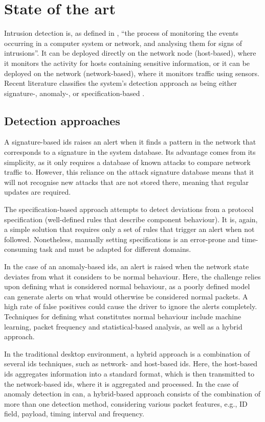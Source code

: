 \chapter{State of the art}
\label{c:sota}

Intrusion detection is, as defined in \cite{Liao2013}, “the process of monitoring the events occurring in a computer system or network, and analysing them for signs of intrusions”. It can be deployed directly on the network node (host-based), where it monitors the activity for hosts containing sensitive information, or it can be deployed on the network (network-based), where it monitors traffic using sensors. Recent literature classifies the system’s detection approach as being either signature-, anomaly-, or specification-based \citep{Lokman2019}.

\section{Detection approaches}
\label{sec:ids_detection_approaches}

A signature-based \gls{ids} raises an alert when it finds a pattern in the network that corresponds to a signature in the system database. Its advantage comes from its simplicity, as it only requires a database of known attacks to compare network traffic to. However, this reliance on the attack signature database means that it will not recognise new attacks that are not stored there, meaning that regular updates are required.\par
The specification-based approach attempts to detect deviations from a protocol specification (well-defined rules that describe component behaviour). It is, again, a simple solution that requires only a set of rules that trigger an alert when not followed. Nonetheless, manually setting specifications is an error-prone and time-consuming task and must be adapted for different domains.\par
In the case of an anomaly-based \gls{ids}, an alert is raised when the network state deviates from what it considers to be normal behaviour. Here, the challenge relies upon defining what is considered normal behaviour, as a poorly defined model can generate alerts on what would otherwise be considered normal packets. A high rate of false positives could cause the driver to ignore the alerts completely. Techniques for defining what constitutes normal behaviour include machine learning, packet frequency and statistical-based analysis, as well as a hybrid approach.\par
In the traditional desktop environment, a hybrid approach is a combination of several \gls{ids} techniques, such as network- and host-based \gls{ids}. Here, the host-based \gls{ids} aggregates information into a standard format, which is then transmitted to the network-based \gls{ids}, where it is aggregated and processed. In the case of anomaly detection in \gls{can}, a hybrid-based approach consists of the combination of more than one detection method, considering various packet features, e.g., ID field, payload, timing interval and frequency.


